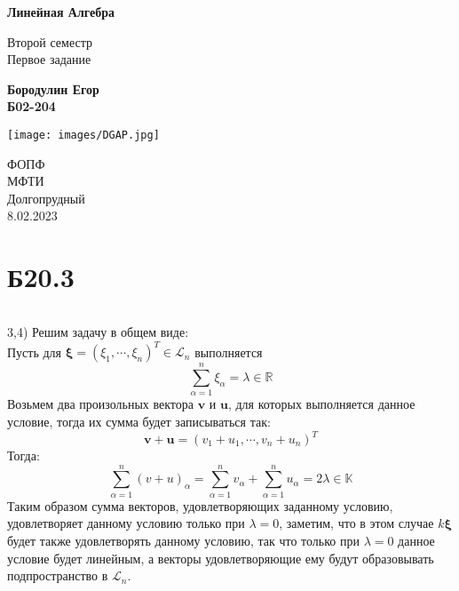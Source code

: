 \documentclass[a4paper,12pt]{article} %
\begin{document}
\begin{titlepage}
    \begin{center}
        \vspace*{1cm}
            
        \Huge
        \textbf{Линейная Алгебра}
            
        \vspace{0.5cm}
        \LARGE
        Второй семестр\\
        Первое задание
            
        \vspace{1.5cm}
            
        \textbf{Бородулин Егор \\ Б02-204}
        
        \vfill
        
        \texttt{[image: images/DGAP.jpg]}
        
        \vspace{0.8cm}
            
        \Large
        ФОПФ\\
        МФТИ\\
        Долгопрудный\\
        8.02.2023
            
    \end{center}
\end{titlepage}

\section*{Б20.3}$\ $

3,4) Решим задачу в общем виде:\\
Пусть для $\pmb\xi=(\xi_1,\cdots,\xi_n)^{T}\in\mathcal{L}_n$ выполняется $$\sum_{\alpha=1}^{n}\xi_{\alpha}=\lambda\in\mathbb{R}$$
Возьмем два произольных вектора $\pmb v$ и $\pmb u$, для которых выполняется данное условие, тогда их сумма будет записываться так:
$$\pmb{v}+\pmb{u}=(v_1+u_1,\cdots,v_n+u_n)^{T}$$
Тогда:
$$\sum_{\alpha=1}^{n}(v+u)_{\alpha}=\sum_{\alpha=1}^{n}v_{\alpha}+\sum_{\alpha=1}^{n}u_{\alpha}=2\lambda\in\mathbb{K}$$
Таким образом сумма векторов, удовлетворяющих заданному условию, удовлетворяет данному условию только при $\lambda=0$, заметим, что в этом случае $k\pmb{\xi}$ будет также удовлетворять данному условию, так что только при $\lambda=0$ данное условие будет линейным, а векторы удовлетворяющие ему будут образовывать подпространство в $\mathcal{L}_n$.
\end{document}

